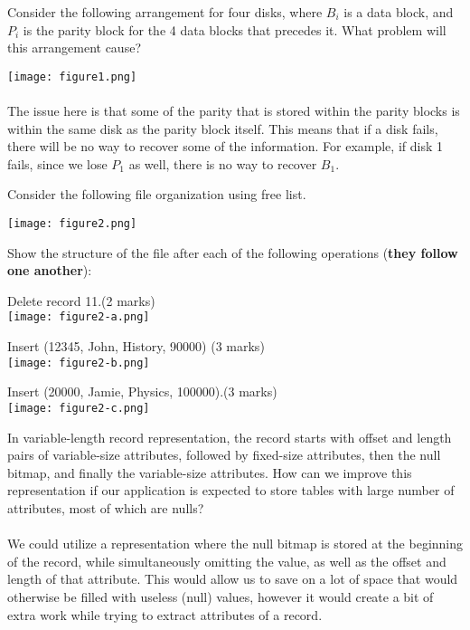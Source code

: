\documentclass[a4 paper]{article}
\begin{document}
Consider the following arrangement for four disks, where $B_{i}$ is a data block, and $P_{i}$ is the parity block for the 4 data blocks that precedes it. What problem will this arrangement cause?

{\centering \texttt{[image: figure1.png]}}\\\\

The issue here is that some of the parity that is stored within the parity blocks is within the same disk as the parity block itself. This means that if a disk fails, there will be no way to recover some of the information. For example, if disk 1 fails, since we lose $P_1$ as well, there is no way to recover $B_1$.



Consider the following file organization using free list.

{\centering \texttt{[image: figure2.png]}}

Show the structure of the file after each of the following operations (\textbf{they follow one another}):

 Delete record 11.\indent (2 marks)\\
{\centering \texttt{[image: figure2-a.png]}}


 Insert (12345, John, History, 90000) (3 marks)\\

{\centering \texttt{[image: figure2-b.png]}}


 Insert (20000, Jamie, Physics, 100000).\indent (3 marks)\\

{\centering \texttt{[image: figure2-c.png]}}




In variable-length record representation, the record starts with offset and length pairs of variable-size attributes, followed by fixed-size attributes, then the null bitmap, and finally the variable-size attributes. How can we improve this representation if our application is expected to store tables with large number of attributes, most of which are nulls?\\\\

We could utilize a representation where the null bitmap is stored at the beginning of the record, while simultaneously omitting the value, as well as the offset and length of that attribute. This would allow us to save on a lot of space that would otherwise be filled with useless (null) values, however it would create a bit of extra work while trying to extract attributes of a record.
\end{document}
